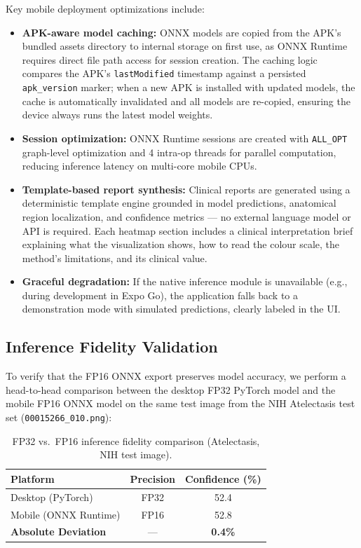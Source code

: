 \documentclass[12pt,a4paper]{report}
\begin{document}
\noindent Key mobile deployment optimizations include:

\begin{itemize}
    \item \textbf{APK-aware model caching:} ONNX models are copied from the APK's bundled assets directory to internal storage on first use, as ONNX Runtime requires direct file path access for session creation. The caching logic compares the APK's \texttt{lastModified} timestamp against a persisted \texttt{apk\_version} marker; when a new APK is installed with updated models, the cache is automatically invalidated and all models are re-copied, ensuring the device always runs the latest model weights.
    \item \textbf{Session optimization:} ONNX Runtime sessions are created with \texttt{ALL\_OPT} graph-level optimization and 4 intra-op threads for parallel computation, reducing inference latency on multi-core mobile CPUs.
    \item \textbf{Template-based report synthesis:} Clinical reports are generated using a deterministic template engine grounded in model predictions, anatomical region localization, and confidence metrics --- no external language model or API is required. Each heatmap section includes a clinical interpretation brief explaining what the visualization shows, how to read the colour scale, the method's limitations, and its clinical value.
    \item \textbf{Graceful degradation:} If the native inference module is unavailable (e.g., during development in Expo Go), the application falls back to a demonstration mode with simulated predictions, clearly labeled in the UI.
\end{itemize}

\subsection{Inference Fidelity Validation}

To verify that the FP16 ONNX export preserves model accuracy, we perform a head-to-head comparison between the desktop FP32 PyTorch model and the mobile FP16 ONNX model on the same test image from the NIH Atelectasis test set (\texttt{00015266\_010.png}):

\begin{table}[h]
\centering
\caption{FP32 vs.\ FP16 inference fidelity comparison (Atelectasis, NIH test image).}
\label{tab:fp16_validation}
\begin{tabular}{@{}lcc@{}}
\toprule
\textbf{Platform} & \textbf{Precision} & \textbf{Confidence (\%)} \\
\midrule
Desktop (PyTorch) & FP32 & 52.4 \\
Mobile (ONNX Runtime) & FP16 & 52.8 \\
\midrule
\textbf{Absolute Deviation} & --- & \textbf{0.4\%} \\
\bottomrule
\end{tabular}
\end{table}
\end{document}
